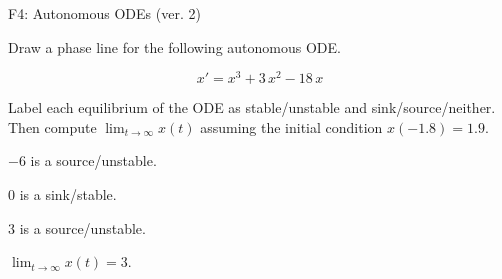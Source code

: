 \begin{exercise}
  \begin{exerciseTitle}F4: Autonomous ODEs (ver. 2)\end{exerciseTitle}
  \begin{exerciseStatement}
    

      Draw a phase line for the following 
      autonomous ODE.
    

    
\[x'= x^{3} + 3 \, x^{2} - 18 \, x\]

    

      Label each equilibrium of the ODE
      as stable/unstable and sink/source/neither.
      Then compute \(\lim_{t\to\infty}x(t)\)
      assuming the initial condition
      \(x( -1.8 )= 1.9\).
    

  \end{exerciseStatement}
  \begin{exerciseAnswer}
    

      \(-6\) is a source/unstable.
      
        \(0\) is a sink/stable.
      
      \(3\) is a source/unstable.
    

    

      \(\lim_{t\to\infty}x(t)=3\).
    

  \end{exerciseAnswer}
\end{exercise}